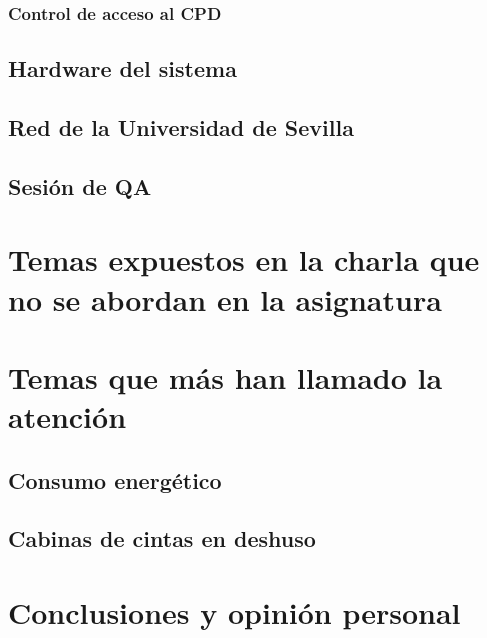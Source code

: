 \documentclass[a4paper,11pt]{article}
\begin{document}
\subsubsection{Control de acceso al CPD}

\subsection{Hardware del sistema}

\subsection{Red de la Universidad de Sevilla}

\subsection{Sesión de QA}


\section{Temas expuestos en la charla que no se abordan en la asignatura}

\section{Temas que más han llamado la atención}
\subsection{Consumo energético}
\subsection{Cabinas de cintas en deshuso}

\section{Conclusiones y opinión personal}

\begin{thebibliography}{99}
\end{thebibliography}
\end{document}
